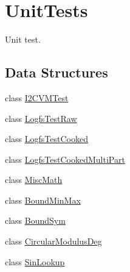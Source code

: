 \hypertarget{group___unit_tests}{\section{\-Unit\-Tests}
\label{group___unit_tests}
}


\-Unit test.  


\subsection*{\-Data \-Structures}
\begin{DoxyCompactItemize}
\item 
class \hyperlink{class_i2_c_v_m_test}{\-I2\-C\-V\-M\-Test}
\item 
class \hyperlink{class_logfs_test_raw}{\-Logfs\-Test\-Raw}
\item 
class \hyperlink{class_logfs_test_cooked}{\-Logfs\-Test\-Cooked}
\item 
class \hyperlink{class_logfs_test_cooked_multi_part}{\-Logfs\-Test\-Cooked\-Multi\-Part}
\item 
class \hyperlink{class_misc_math}{\-Misc\-Math}
\item 
class \hyperlink{class_bound_min_max}{\-Bound\-Min\-Max}
\item 
class \hyperlink{class_bound_sym}{\-Bound\-Sym}
\item 
class \hyperlink{class_circular_modulus_deg}{\-Circular\-Modulus\-Deg}
\item 
class \hyperlink{class_sin_lookup}{\-Sin\-Lookup}
\end{DoxyCompactItemize}
